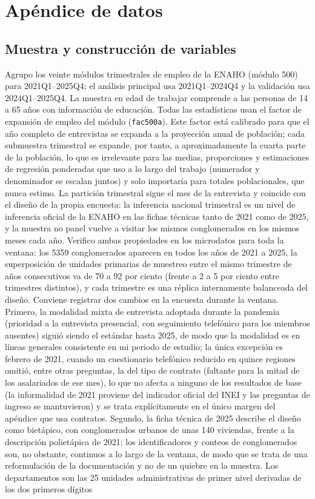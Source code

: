 \section{Apéndice de datos}\label{app:data}

\subsection{Muestra y construcción de variables}

Agrupo los veinte módulos trimestrales de empleo de la ENAHO (módulo 500) para 2021Q1--2025Q4; el análisis principal usa 2021Q1--2024Q4 y la validación usa 2024Q1--2025Q4. La muestra en edad de trabajar comprende a las personas de 14 a 65 años con información de educación. Todas las estadísticas usan el factor de expansión de empleo del módulo (\texttt{fac500a}). Este factor está calibrado para que el año completo de entrevistas se expanda a la proyección anual de población; cada submuestra trimestral se expande, por tanto, a aproximadamente la cuarta parte de la población, lo que es irrelevante para las medias, proporciones y estimaciones de regresión ponderadas que uso a lo largo del trabajo (numerador y denominador se escalan juntos) y solo importaría para totales poblacionales, que nunca estimo. La partición trimestral sigue el mes de la entrevista y coincide con el diseño de la propia encuesta: la inferencia nacional trimestral es un nivel de inferencia oficial de la ENAHO en las fichas técnicas tanto de 2021 como de 2025, y la muestra no panel vuelve a visitar los mismos conglomerados en los mismos meses cada año. Verifico ambas propiedades en los microdatos para toda la ventana: los 5359 conglomerados aparecen en todos los años de 2021 a 2025, la superposición de unidades primarias de muestreo entre el mismo trimestre de años consecutivos va de 70 a 92 por ciento (frente a 2 a 5 por ciento entre trimestres distintos), y cada trimestre es una réplica internamente balanceada del diseño. Conviene registrar dos cambios en la encuesta durante la ventana. Primero, la modalidad mixta de entrevista adoptada durante la pandemia (prioridad a la entrevista presencial, con seguimiento telefónico para los miembros ausentes) siguió siendo el estándar hasta 2025, de modo que la modalidad es en líneas generales consistente en mi periodo de estudio; la única excepción es febrero de 2021, cuando un cuestionario telefónico reducido en quince regiones omitió, entre otras preguntas, la del tipo de contrato (faltante para la mitad de los asalariados de ese mes), lo que no afecta a ninguno de los resultados de base (la informalidad de 2021 proviene del indicador oficial del INEI y las preguntas de ingreso se mantuvieron) y se trata explícitamente en el único margen del apéndice que usa contratos. Segundo, la ficha técnica de 2025 describe el diseño como bietápico, con conglomerados urbanos de unas 140 viviendas, frente a la descripción polietápica de 2021; los identificadores y conteos de conglomerados son, no obstante, continuos a lo largo de la ventana, de modo que se trata de una reformulación de la documentación y no de un quiebre en la muestra. Los departamentos son las 25 unidades administrativas de primer nivel derivadas de los dos primeros dígitos 